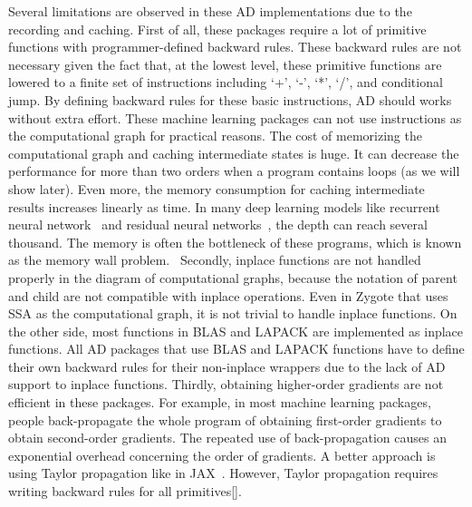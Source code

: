 \documentclass[aps,twocolumn,longbibliography,english,superscriptaddress]{revtex4-1}
\newcommand{\<}{\langle}
\renewcommand{\>}{\rangle}
\newcommand{\blue}[1]{[{\bf  \color{blue}{JG: #1}}]}
\theoremstyle{definition}\newtheorem{definition}{\textit{Definition}}
\begin{document}
    Several limitations are observed in these AD implementations due to the recording and caching. First of all, these packages require a lot of primitive functions with programmer-defined backward rules. These backward rules are not necessary given the fact that, at the lowest level, these primitive functions are lowered to a finite set of instructions including `+', `-', `*', `/', and conditional jump. By defining backward rules for these basic instructions, AD should works without extra effort. These machine learning packages can not use instructions as the computational graph for practical reasons. The cost of memorizing the computational graph and caching intermediate states is huge. It can decrease the performance for more than two orders when a program contains loops (as we will show later).
    Even more, the memory consumption for caching intermediate results increases linearly as time. In many deep learning models like recurrent neural network~\cite{Lipton2015} and residual neural networks~\cite{He2016}, the depth can reach several thousand. The memory is often the bottleneck of these programs, which is known as the memory wall problem.~\cite{memorywall}
    Secondly, inplace functions are not handled properly in the diagram of computational graphs, because the notation of parent and child are not compatible with inplace operations.
 Even in Zygote that uses SSA as the computational graph, it is not trivial to handle inplace functions.
    On the other side, most functions in BLAS and LAPACK are implemented as inplace functions. All AD packages that use BLAS and LAPACK functions have to define their own backward rules for their non-inplace wrappers due to the lack of AD support to inplace functions.
    Thirdly, obtaining higher-order gradients are not efficient in these packages. For example, in most machine learning packages, people back-propagate the whole program of obtaining first-order gradients to obtain second-order gradients. The repeated use of back-propagation causes an exponential overhead concerning the order of gradients. A better approach is using Taylor propagation like in JAX~\cite{Bettencourt2019}. However, Taylor propagation requires writing backward rules for all primitives\blue{true?}. %

\end{document}
